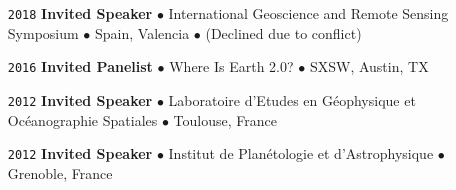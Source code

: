 \begin{itemize}[leftmargin=3.8em, labelsep=1.5em]
    \item[\texttt{2018}] \textbf{Invited Speaker} $\bullet$ International Geoscience and Remote Sensing Symposium $\bullet$ Spain, Valencia $\bullet$ (Declined due to conflict)
    \item[\texttt{2016}] \textbf{Invited Panelist} $\bullet$ Where Is Earth 2.0? $\bullet$ SXSW, Austin, TX
    \item[\texttt{2012}] \textbf{Invited Speaker} $\bullet$ Laboratoire d'Etudes en Géophysique et Océanographie Spatiales $\bullet$ Toulouse, France
    \item[\texttt{2012}] \textbf{Invited Speaker} $\bullet$ Institut de Planétologie et d'Astrophysique $\bullet$ Grenoble, France
\end{itemize}